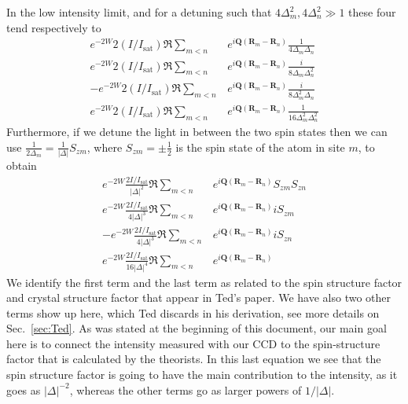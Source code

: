 \documentclass[11pt,letter]{article}
\newcommand{\bv}[1]{\ensuremath{\bm{#1}}}
\begin{document}
In the low intensity limit, and for a detuning such that $4\Delta_{m}^{2}, 4\Delta_{n}^{2} \gg 1 $ these four tend respectively to 
\begin{align} 
    e^{-2W} 2(I/I_{\mathrm{sat}}) \Re \sum_{m<n} & 
      e^{ i \bv{Q}( \bv{R}_{m} - \bv{R}_{n} ) } 
      \frac{1}{ 4 \Delta_{m} \Delta_{n} }  \\
    e^{-2W} 2(I/I_{\mathrm{sat}}) \Re \sum_{m<n} & 
      e^{ i \bv{Q}( \bv{R}_{m} - \bv{R}_{n} ) } 
      \frac{i}{ 8 \Delta_{m} \Delta_{n}^{2}} \\
  - e^{-2W} 2(I/I_{\mathrm{sat}}) \Re \sum_{m<n} & 
      e^{ i \bv{Q}( \bv{R}_{m} - \bv{R}_{n} ) } 
      \frac{i}{ 8 \Delta_{m}^{2} \Delta_{n} } \\
    e^{-2W} 2(I/I_{\mathrm{sat}}) \Re \sum_{m<n} & 
      e^{ i \bv{Q}( \bv{R}_{m} - \bv{R}_{n} ) } 
      \frac{1}{ 16 \Delta_{m}^{2} \Delta_{n}^{2} }
\end{align}
Furthermore, if we detune the light in between the two spin states then we can
use $\frac{1}{2\Delta_{m}} = \frac{1}{|\Delta|}S_{zm}$, where
$S_{zm}=\pm\frac{1}{2}$ is the spin state of the atom in site $m$, to obtain
\begin{align} 
    e^{-2W} \frac{2I/I_{\mathrm{sat}}}{ |\Delta|^{2} }  \Re \sum_{m<n} & 
      e^{ i \bv{Q}( \bv{R}_{m} - \bv{R}_{n} ) } 
      S_{zm}S_{zn}  \\
    e^{-2W} \frac{2I/I_{\mathrm{sat}}}{ 4 |\Delta|^{3} }  \Re \sum_{m<n} & 
      e^{ i \bv{Q}( \bv{R}_{m} - \bv{R}_{n} ) } 
       i S_{zm} \\
  - e^{-2W} \frac{2I/I_{\mathrm{sat}}}{ 4 |\Delta|^{3} }  \Re \sum_{m<n} & 
      e^{ i \bv{Q}( \bv{R}_{m} - \bv{R}_{n} ) }
       i S_{zn} \\  
    e^{-2W} \frac{2I/I_{\mathrm{sat}}}{ 16 |\Delta|^{4} }  \Re \sum_{m<n} & 
      e^{ i \bv{Q}( \bv{R}_{m} - \bv{R}_{n} ) } 
\end{align}
We identify the first term and the last term as related to the spin structure factor and crystal structure factor that appear in Ted's
paper.   We have also two other terms show up here, which Ted discards in his
derivation, see more details on Sec.~\ref{sec:Ted}.    As was stated at the beginning of this document, our main goal here is to connect the intensity measured with our CCD to the spin-structure factor that is calculated by the theorists.   In this last equation we see that the spin structure factor is going to have the main contribution to the intensity, as it goes as $ |\Delta|^{-2} $, whereas the other terms go as larger powers of $1/|\Delta|$.  
\end{document}
